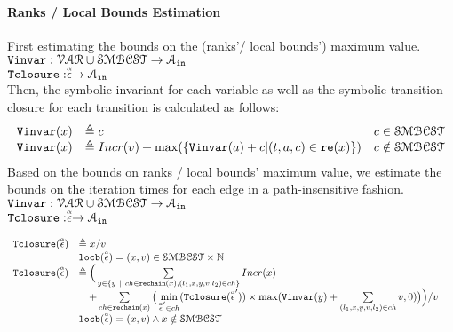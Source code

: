 \paragraph*{Ranks / Local Bounds Estimation}
First estimating the bounds on the (ranks'/ local bounds') maximum value.
\\ 
$ {\mathtt{Vinvar}}: \mathcal{VAR} \cup \mathcal{SMBCST} \to \mathcal{A}_{\mathtt{in}}$
\\
${\mathtt{Tclosure}}: \stackrel{\scriptscriptstyle{\alpha}}{\mathtt{\epsilon}{}} \to \mathcal{A}_{\mathtt{in}}$
\\
Then, the symbolic invariant for each variable 
as well as the symbolic transition closure for each transition is calculated as follows:
\[ 
\begin{array}{lll}
  {\ensuremath{\mathtt{Vinvar}}}(x) & \triangleq c & c \in \mathcal{SMBCST} \\
  {\mathtt{Vinvar}}(x) & \triangleq Incr(v) + \max(\{{\mathtt{Vinvar}}(a) + c | (t, a, c) \in \mathtt{re}(x)\}) & c \notin \mathcal{SMBCST}
\end{array}
\]
%
Based on the bounds on ranks / local bounds' maximum value,
we estimate the bounds on the iteration times
for each edge in a path-insensitive fashion.
\\ 
$ {\mathtt{Vinvar}}: \mathcal{VAR} \cup \mathcal{SMBCST} \to \mathcal{A}_{\mathtt{in}}$
\\
${\mathtt{Tclosure}}: \stackrel{\scriptscriptstyle{\alpha}}{\mathtt{\epsilon}{}} \to \mathcal{A}_{\mathtt{in}}$
\\
%
\begin{defn}
  \label{def:transition_closure}
\[ 
\begin{array}{lll}
  {\ensuremath{\mathtt{Tclosure}}}(\stackrel{\scriptscriptstyle{\alpha}}{\mathtt{\epsilon}{}}) 
  & \triangleq x / v & \\ 
  & \mathtt{locb}(\stackrel{\scriptscriptstyle{\alpha}}{\mathtt{\epsilon}{}}) = (x, v) \in \mathcal{SMBCST} \times \mathbb{N} & \\
  {\mathtt{Tclosure}}(\stackrel{\scriptscriptstyle{\alpha}}{\mathtt{\epsilon}{}}) 
  & \triangleq \Big(
    \sum\limits_{y \in \{ y ~|~ 
    ch \in \mathtt{rechain}(x), (l_1, x, y, v, l_2) \in ch \} } Incr(x) & \\
    & \quad + 
  \sum\limits_{ch \in \mathtt{rechain}(x)}
  \big( \min\limits_{\stackrel{\scriptscriptstyle{\alpha}}{\mathtt{\epsilon}{}}' \in ch}({{\mathtt{Tclosure}}(\stackrel{\scriptscriptstyle{\alpha}}{\mathtt{\epsilon}{}}')}) \times 
  \max({\mathtt{Vinvar}}(y) + \sum\limits_{(l_1, x, y, v, l_2) \in ch } v, 0)\big) \Big) / v & \\
  & \mathtt{locb}(\stackrel{\scriptscriptstyle{\alpha}}{\mathtt{\epsilon}{}}) = (x, v) \land x \notin \mathcal{SMBCST} & 
\end{array}
  \]
\end{defn}
